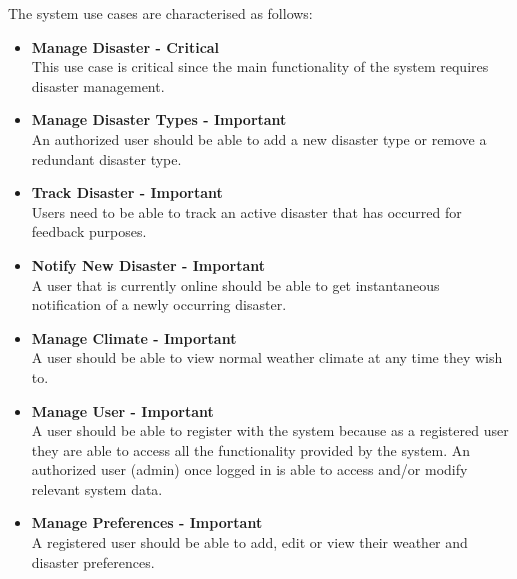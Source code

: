 The system use cases are characterised as follows:
 \begin{itemize}

 	\item \textbf{Manage Disaster - Critical}\\ This use case is critical since the main functionality of the system requires disaster management.
 	\item \textbf{Manage Disaster Types - Important}\\ An authorized user should be able to add a new disaster type or remove a redundant disaster type.
	\item \textbf{Track Disaster - Important}\\ Users need to be able to track an active disaster that has occurred for feedback purposes. 
 	\item \textbf{Notify New Disaster - Important}\\ A user that is currently online should be able to get instantaneous notification of a newly occurring disaster.
 	\item \textbf{Manage Climate - Important}\\ A user should be able to view normal weather climate at any time they wish to.
 	\item \textbf{Manage User - Important} \\ A user should be able to register with the system because as a registered user they are able to access all the functionality provided by the system.  An authorized user (admin) once logged in is able to access and/or modify relevant system data.
	\item \textbf{Manage Preferences - Important} \\ A registered user should be able to add, edit or view their weather and disaster preferences.
 \end{itemize}